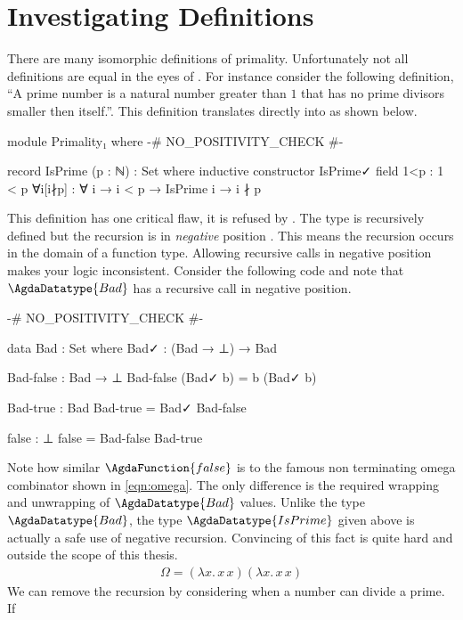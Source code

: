 \documentclass[./Thesis.tex]{subfiles}
\begin{document}
\section{Investigating Definitions}
\label{sec:investigating-definitions}
There are many isomorphic definitions of primality. Unfortunately not all
definitions are equal in the eyes of \Agda{}. For instance consider the
following definition, ``A prime number is a natural number greater than $1$ that
has no prime divisors smaller then itself.''. This definition translates
directly into \Agda{} as shown below.
\begin{code}[hide]
  module Primality₁ where
    {-# NO_POSITIVITY_CHECK #-}
\end{code}
\begin{code}
    record IsPrime (p : ℕ) : Set where
      inductive
      constructor IsPrime✓
      field
        1<p : 1 < p
        ∀i[i∤p] : ∀ {i} → i < p → IsPrime i → i ∤ p
\end{code}
This definition has one critical flaw, it is refused by \Agda{}. The type is
recursively defined but the recursion is in \textit{negative} position
\cite{harper}. This means the recursion occurs in the domain of a function type.
Allowing recursive calls in negative position makes your logic inconsistent.
Consider the following code and note that $\AgdaDatatype{Bad}$ has a recursive
call in negative position.
\begin{code}[hide]
  {-# NO_POSITIVITY_CHECK #-}
\end{code}
\begin{code}
  data Bad : Set where
    Bad✓ : (Bad → ⊥) → Bad

  Bad-false : Bad → ⊥
  Bad-false (Bad✓ b) = b (Bad✓ b)

  Bad-true : Bad
  Bad-true = Bad✓ Bad-false

  false : ⊥
  false = Bad-false Bad-true
\end{code}
Note how similar $\AgdaFunction{false}$ is to the famous non terminating omega
combinator shown in \ref{eqn:omega}. The only difference is the required
wrapping and unwrapping of $\AgdaDatatype{Bad}$ values. Unlike the type
$\AgdaDatatype{Bad}$, the type $\AgdaDatatype{IsPrime}$ given above is actually a safe
use of negative recursion. Convincing \Agda{} of this fact is quite hard and
outside the scope of this thesis.
\begin{align}
  \label{eqn:omega}
  \Omega = (\lambda x. \, x \, x) (\lambda x. \, x \, x)
\end{align}
We can remove the recursion by considering when a number can divide a prime. If
\end{document}
